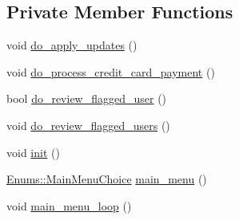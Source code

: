 \subsection*{Private Member Functions}
\begin{DoxyCompactItemize}
\item 
void \hyperlink{classAsteroids_1_1UI_1_1ServerTextUI_1_1ServerTextUI_a35d6eb54e2eabfff2cc1ee47a6c228c6}{do\+\_\+apply\+\_\+updates} ()
\item 
void \hyperlink{classAsteroids_1_1UI_1_1ServerTextUI_1_1ServerTextUI_a6713eb173fef32a2fc96932b96ce2dea}{do\+\_\+process\+\_\+credit\+\_\+card\+\_\+payment} ()
\item 
bool \hyperlink{classAsteroids_1_1UI_1_1ServerTextUI_1_1ServerTextUI_af85d5a35efcb8c75fe7b5419da0d6f93}{do\+\_\+review\+\_\+flagged\+\_\+user} ()
\item 
void \hyperlink{classAsteroids_1_1UI_1_1ServerTextUI_1_1ServerTextUI_a5518087c5d0ab9fd8c24c1b6948ee11b}{do\+\_\+review\+\_\+flagged\+\_\+users} ()
\item 
void \hyperlink{classAsteroids_1_1UI_1_1ServerTextUI_1_1ServerTextUI_aa01e964f791e5ea9840f7a49a3e55736}{init} ()
\item 
\hyperlink{namespaceAsteroids_1_1UI_1_1ServerTextUI_1_1Enums_ab80731b6b7455a57d7247f6ac859af32}{Enums\+::\+Main\+Menu\+Choice} \hyperlink{classAsteroids_1_1UI_1_1ServerTextUI_1_1ServerTextUI_afc4ba344c4244c2650ade2148e08d5f2}{main\+\_\+menu} ()
\item 
void \hyperlink{classAsteroids_1_1UI_1_1ServerTextUI_1_1ServerTextUI_aae7cc1a6a551fc4dbd5ac7270f1d3e94}{main\+\_\+menu\+\_\+loop} ()
\end{DoxyCompactItemize}
